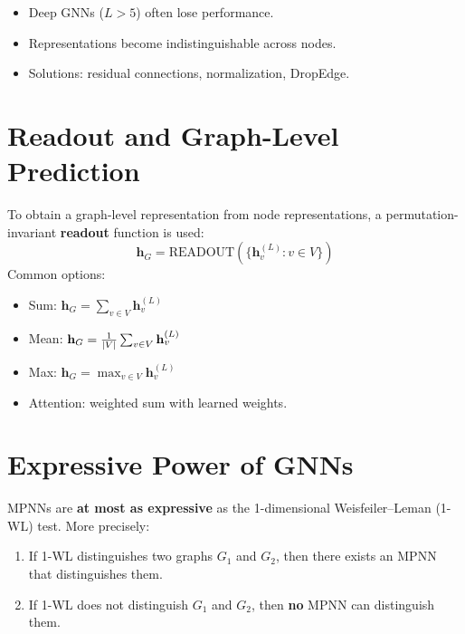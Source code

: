 \begin{warning}[title=\textbf{Practical consequences}]
\begin{itemize}
    \item Deep GNNs ($L > 5$) often lose performance.
    \item Representations become indistinguishable across nodes.
    \item Solutions: residual connections, normalization, DropEdge.
\end{itemize}
\end{warning}

\section{Readout and Graph-Level Prediction}

\begin{definition}[Readout]
To obtain a graph-level representation from node representations, a
permutation-invariant \textbf{readout} function is used:
\[
    \mathbf{h}_G = \text{READOUT}(\{\mathbf{h}_v^{(L)} : v \in V\})
\]
Common options:
\begin{itemize}
    \item Sum: $\mathbf{h}_G = \sum_{v \in V} \mathbf{h}_v^{(L)}$
    \item Mean: $\mathbf{h}_G = \frac{1}{\left| V \right|} \sum_{v \in V} \mathbf{h}_v^{(L)}$
    \item Max: $\mathbf{h}_G = \max_{v \in V} \mathbf{h}_v^{(L)}$
    \item Attention: weighted sum with learned weights.
\end{itemize}
\end{definition}

\section{Expressive Power of GNNs}

\begin{theorem}
MPNNs are \textbf{at most as expressive} as the 1-dimensional
Weisfeiler--Leman (1-WL) test. More precisely:
\begin{enumerate}
    \item If 1-WL distinguishes two graphs $G_1$ and $G_2$, then there exists
          an MPNN that distinguishes them.
    \item If 1-WL does not distinguish $G_1$ and $G_2$, then \textbf{no} MPNN
          can distinguish them.
\end{enumerate}
\end{theorem}

